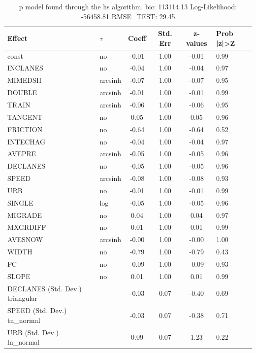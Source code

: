 \begin{table}
	\caption{p model found through the hs algorithm. bic: 113114.13 Log-Likelihood: -56458.81 RMSE_TEST: 29.45}
	\begin{center}
		\begin{tabular}{|l|l|c|c|c|l|}
			\hline
			Effect & $\tau$ & Coeff & Std. Err & z-values & Prob |z|>Z \\
			\hline
			const & no & -0.01 & 1.00 & -0.01 & 0.99 \\
			\hline
			INCLANES & no & -0.04 & 1.00 & -0.04 & 0.97 \\
			\hline
			MIMEDSH & arcsinh & -0.07 & 1.00 & -0.07 & 0.95 \\
			\hline
			DOUBLE & arcsinh & -0.01 & 1.00 & -0.01 & 0.99 \\
			\hline
			TRAIN & arcsinh & -0.06 & 1.00 & -0.06 & 0.95 \\
			\hline
			TANGENT & no & 0.05 & 1.00 & 0.05 & 0.96 \\
			\hline
			FRICTION & no & -0.64 & 1.00 & -0.64 & 0.52 \\
			\hline
			INTECHAG & no & -0.04 & 1.00 & -0.04 & 0.97 \\
			\hline
			AVEPRE & arcsinh & -0.05 & 1.00 & -0.05 & 0.96 \\
			\hline
			DECLANES & no & -0.05 & 1.00 & -0.05 & 0.96 \\
			\hline
			SPEED & arcsinh & -0.08 & 1.00 & -0.08 & 0.93 \\
			\hline
			URB & no & -0.01 & 1.00 & -0.01 & 0.99 \\
			\hline
			SINGLE & log & -0.05 & 1.00 & -0.05 & 0.96 \\
			\hline
			MIGRADE & no & 0.04 & 1.00 & 0.04 & 0.97 \\
			\hline
			MXGRDIFF & no & 0.01 & 1.00 & 0.01 & 0.99 \\
			\hline
			AVESNOW & arcsinh & -0.00 & 1.00 & -0.00 & 1.00 \\
			\hline
			WIDTH & no & -0.79 & 1.00 & -0.79 & 0.43 \\
			\hline
			FC & no & -0.09 & 1.00 & -0.09 & 0.93 \\
			\hline
			SLOPE & no & 0.01 & 1.00 & 0.01 & 0.99 \\
			\hline
			DECLANES (Std. Dev.) triangular &  & -0.03 & 0.07 & -0.40 & 0.69 \\
			\hline
			SPEED (Std. Dev.) tn_normal &  & -0.03 & 0.07 & -0.38 & 0.71 \\
			\hline
			URB (Std. Dev.) ln_normal &  & 0.09 & 0.07 & 1.23 & 0.22 \\

\end{tabular}
\end{center}
\end{table}
